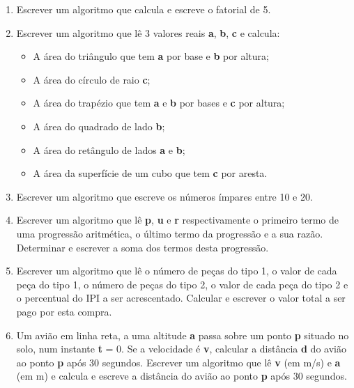 \documentclass[onecolumn,a4paper,10pt]{report}
\newcommand{\+}{\, + \,}
\newcommand{\<}{\hspace*{-0.4cm}}
\begin{document}
\begin{enumerate}[1.]
\item Escrever um algoritmo que calcula e escreve o fatorial de 5.

\item Escrever um algoritmo que lê 3 valores reais \textbf{a}, \textbf{b}, \textbf{c} e calcula:
\begin{itemize}
    \item A área do triângulo que tem \textbf{a} por base e \textbf{b} por altura;
    \item A área do círculo de raio \textbf{c};
    \item A área do trapézio que tem \textbf{a} e \textbf{b} por bases e \textbf{c} por altura;
    \item A área do quadrado de lado \textbf{b};
    \item A área do retângulo de lados \textbf{a} e \textbf{b};
    \item A área da superfície de um cubo que tem \textbf{c} por aresta.
\end{itemize}

\item Escrever um algoritmo que escreve os números ímpares entre 10 e 20.

\item Escrever um algoritmo que lê \textbf{p}, \textbf{u} e \textbf{r} respectivamente o primeiro termo de uma progressão aritmética, o último termo da progressão e a sua razão. Determinar e escrever a soma dos termos desta progressão.

\item Escrever um algoritmo que lê o número de peças do tipo 1, o valor de cada peça do tipo 1, o número de peças do tipo 2, o valor de cada peça do tipo 2 e o percentual do IPI a ser acrescentado. Calcular e escrever o valor total a ser pago por esta compra.

\item Um avião em linha reta, a uma altitude \textbf{a} passa sobre um ponto \textbf{p} situado no solo, num instante \textbf{t} = 0. Se a velocidade é \textbf{v}, calcular a distância \textbf{d} do avião ao ponto \textbf{p} após 30 segundos. Escrever um algoritmo que lê \textbf{v} (em m/s) e \textbf{a} (em m) e calcula e escreve a distância do avião ao ponto \textbf{p} após 30 segundos.


\end{enumerate}
\end{document}
